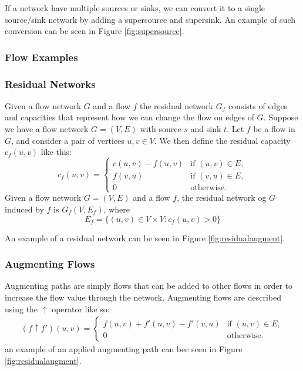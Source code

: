 If a network have multiple sources or sinks, we can convert it to a single
source/sink network by adding a supersource and supersink. An example of such
conversion can be seen in Figure \ref{fig:supersource}.

\subsubsection{Flow Examples}

\subsubsection{Residual Networks}
Given a flow network $G$ and a flow $f$ the residual network $G_f$ consists of
edges and capacities that represent how we can change the flow on edges of $G$.
Suppose we have a flow network $G=(V,E)$ with source $s$ and sink $t$. Let $f$
be a flow in $G$, and consider a pair of vertices $u,v \in V$. We then define
the residual capacity $c_f(u,v)$ like this:
\[
  c_f(u,v) =
  \begin{cases}
    c(u,v) - f(u,v) & \text{if } (u,v) \in E, \\
    f(v,u)          & \text{if } (v,u) \in E, \\
    0               & \text{otherwise}.
  \end{cases}
\]
Given a flow network $G = (V,E)$ and a flow $f$, the residual network og $G$
induced by $f$ is $G_f(V,E_f)$, where
\[
  E_f = \{(u,v) \in V \times V : c_f(u,v) > 0\}
\]

An example of a residual network can be seen in Figure
\ref{fig:residualaugment}.



\subsubsection{Augmenting Flows}
Augmenting paths are simply flows that can be added to other flows in order to
increase the flow value through the network. Augmenting flows are described
using the $\uparrow$ operator like so:
\begin{align*}
  (f\uparrow f')(u,v) =
  \begin{cases}
    f(u,v)+f'(u,v) - f'(v,u) & \text{if } (u,v) \in E, \\
    0                        & \text{otherwise}.
  \end{cases}
\end{align*}
an example of an applied augmenting path can bee seen in Figure
\ref{fig:residualaugment}.

